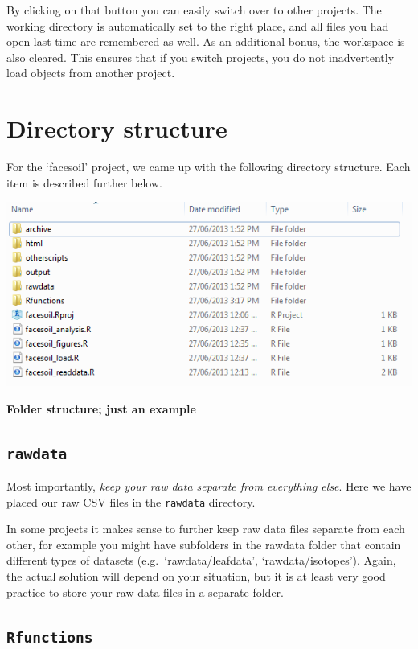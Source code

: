 \documentclass[]{book}
\begin{document}
By clicking on that button you can easily switch over to other projects. The working directory is automatically set to the right place, and all files you had open last time are remembered as well. As an additional bonus, the workspace is also cleared. This ensures that if you switch projects, you do not inadvertently load objects from another project.

\hypertarget{directory-structure}{%
\section{Directory structure}\label{directory-structure}}

For the `facesoil' project, we came up with the following directory structure. Each item is described further below.

\includegraphics[width=0.7\linewidth]{screenshots/folderstructure}

\textbf{Folder structure; just an example}

\hypertarget{rawdata}{%
\subsection{\texorpdfstring{\texttt{rawdata}}{rawdata}}\label{rawdata}}

Most importantly, \emph{keep your raw data separate from everything else}. Here we have placed our raw CSV files in the \texttt{rawdata} directory.

In some projects it makes sense to further keep raw data files separate from each other, for example you might have subfolders in the rawdata folder that contain different types of datasets (e.g.~`rawdata/leafdata', `rawdata/isotopes'). Again, the actual solution will depend on your situation, but it is at least very good practice to store your raw data files in a separate folder.

\hypertarget{rfunctions}{%
\subsection{\texorpdfstring{\texttt{Rfunctions}}{Rfunctions}}\label{rfunctions}}
\end{document}
